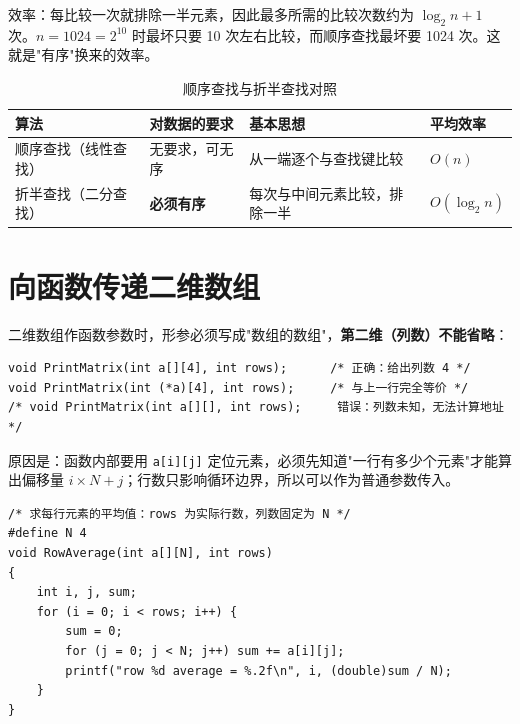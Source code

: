 效率：每比较一次就排除一半元素，因此最多所需的比较次数约为 $\log_2 n + 1$ 次。$n=1024=2^{10}$ 时最坏只要 10 次左右比较，而顺序查找最坏要 1024 次。这就是"有序"换来的效率。


\begin{table}[htbp]
\centering
\caption{顺序查找与折半查找对照}
\footnotesize
\begin{tabularx}{\textwidth}{@{}p{2.4cm}p{2.4cm}Xp{2.6cm}@{}}
\toprule
算法 & 对数据的要求 & 基本思想 & 平均效率 \\
\midrule
顺序查找（线性查找） & 无要求，可无序 & 从一端逐个与查找键比较 & $O(n)$ \\
折半查找（二分查找） & \textbf{必须有序} & 每次与中间元素比较，排除一半 & $O(\log_2 n)$ \\
\bottomrule
\end{tabularx}
\end{table}

\section{向函数传递二维数组}
二维数组作函数参数时，形参必须写成"数组的数组"，\textbf{第二维（列数）不能省略}：
\begin{lstlisting}
void PrintMatrix(int a[][4], int rows);      /* 正确：给出列数 4 */
void PrintMatrix(int (*a)[4], int rows);     /* 与上一行完全等价 */
/* void PrintMatrix(int a[][], int rows);     错误：列数未知，无法计算地址 */
\end{lstlisting}
原因是：函数内部要用 \texttt{a[i][j]} 定位元素，必须先知道"一行有多少个元素"才能算出偏移量 $i\times N+j$；行数只影响循环边界，所以可以作为普通参数传入。

\begin{lstlisting}
/* 求每行元素的平均值：rows 为实际行数，列数固定为 N */
#define N 4
void RowAverage(int a[][N], int rows)
{
    int i, j, sum;
    for (i = 0; i < rows; i++) {
        sum = 0;
        for (j = 0; j < N; j++) sum += a[i][j];
        printf("row %d average = %.2f\n", i, (double)sum / N);
    }
}
\end{lstlisting}


